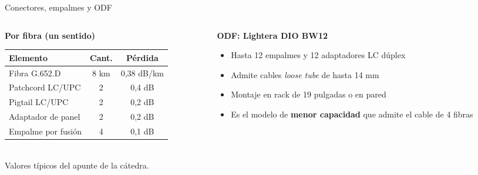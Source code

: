 \documentclass[aspectratio=1610]{beamer}
\begin{document}
\begin{frame}{Conectores, empalmes y ODF}
  \begin{columns}[T]
    \begin{column}{0.52\textwidth}
      \textbf{Por fibra (un sentido)}\\[0.1cm]
      \small
      \begin{tabular}{lcc}
        \toprule
        \textbf{Elemento} & \textbf{Cant.} & \textbf{Pérdida} \\
        \midrule
        Fibra G.652.D & 8 km & 0,38 dB/km \\
        Patchcord LC/UPC & 2 & 0,4 dB \\
        Pigtail LC/UPC & 2 & 0,2 dB \\
        Adaptador de panel & 2 & 0,2 dB \\
        Empalme por fusión & 4 & 0,1 dB \\
        \bottomrule
      \end{tabular}\\[0.15cm]
      \normalsize
      \footnotesize Valores típicos del apunte de la cátedra.
    \end{column}
    \begin{column}{0.48\textwidth}
      \textbf{ODF: Lightera DIO BW12}
      \begin{itemize}
        \item Hasta 12 empalmes y 12 adaptadores LC dúplex
        \item Admite cables \emph{loose tube} de hasta 14 mm
        \item Montaje en rack de 19 pulgadas o en pared
        \item Es el modelo de \textbf{menor capacidad} que admite el cable de 4 fibras
      \end{itemize}
    \end{column}
  \end{columns}
\end{frame}

\end{document}
